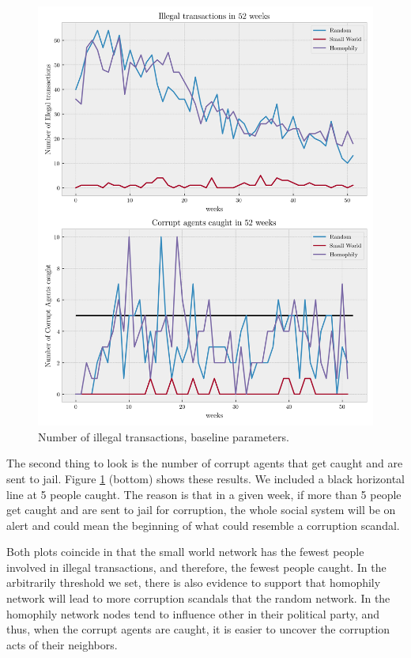 \documentclass[letterpaper, 11pt]{article}
\begin{document}
\begin{figure}[htbp]
\centering
\includegraphics[width=.9\linewidth]{img/f3.png}
\caption{\label{fig:org7d8e959}
Number of illegal transactions, baseline parameters.}
\end{figure}

The second thing to look is the number of corrupt agents that get caught and are sent to jail. Figure \ref{fig:org7d8e959} (bottom) shows these results. We included a black horizontal line at 5 people caught. The reason is that in a given week, if more than 5 people get caught and are sent to jail for corruption, the whole social system will be on alert and could mean the beginning of what could resemble a corruption scandal. 

Both plots coincide in that the small world network has the fewest people involved in illegal transactions, and therefore, the fewest people caught. In the arbitrarily threshold we set, there is also evidence to support that homophily network will lead to more corruption scandals that the random network. In the homophily network nodes tend to influence other in their political party, and thus, when the corrupt agents are caught, it is easier to uncover the corruption acts of their neighbors.
\end{document}
